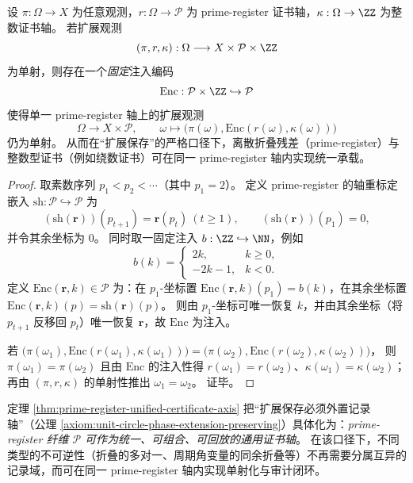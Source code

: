\begin{theorem}\label{thm:prime-register-unified-certificate-axis}
设 \(\pi:\Omega\to X\) 为任意观测，\(r:\Omega\to\mathcal{P}\) 为 prime-register 证书轴，\(\kappa:\Omega\to\ZZ\) 为整数证书轴。
若扩展观测
\[
(\pi,r,\kappa):\Omega\longrightarrow X\times\mathcal{P}\times\ZZ
\]
为单射，则存在一个\emph{固定}注入编码
\[
\mathrm{Enc}:\mathcal{P}\times\ZZ\hookrightarrow \mathcal{P}
\]
使得单一 prime-register 轴上的扩展观测
\[
\Omega\longrightarrow X\times\mathcal{P},\qquad
\omega\longmapsto\bigl(\pi(\omega),\mathrm{Enc}(r(\omega),\kappa(\omega))\bigr)
\]
仍为单射。
从而在“扩展保存”的严格口径下，离散折叠残差（prime-register）与整数型证书（例如绕数证书）可在同一 prime-register 轴内实现统一承载。
\end{theorem}
\begin{proof}
取素数序列 \(p_1<p_2<\cdots\)（其中 \(p_1=2\)）。
定义 prime-register 的轴重标定嵌入 \(\mathrm{sh}:\mathcal{P}\hookrightarrow\mathcal{P}\) 为
\[
(\mathrm{sh}(\mathbf r))(p_{t+1})=\mathbf r(p_t)\ (t\ge 1),
\qquad
(\mathrm{sh}(\mathbf r))(p_1)=0,
\]
并令其余坐标为 \(0\)。
同时取一固定注入 \(b:\ZZ\hookrightarrow\NN\)，例如
\[
b(k)=
\begin{cases}
2k, & k\ge 0,\\
-2k-1, & k<0.
\end{cases}
\]
定义
\(
\mathrm{Enc}(\mathbf r,k)\in\mathcal{P}
\)
为：在 \(p_1\)-坐标置 \(\mathrm{Enc}(\mathbf r,k)(p_1)=b(k)\)，在其余坐标置 \(\mathrm{Enc}(\mathbf r,k)(p)=\mathrm{sh}(\mathbf r)(p)\)。
则由 \(p_1\)-坐标可唯一恢复 \(k\)，并由其余坐标（将 \(p_{t+1}\) 反移回 \(p_t\)）唯一恢复 \(\mathbf r\)，故 \(\mathrm{Enc}\) 为注入。
\par
若 \(\bigl(\pi(\omega_1),\mathrm{Enc}(r(\omega_1),\kappa(\omega_1))\bigr)=\bigl(\pi(\omega_2),\mathrm{Enc}(r(\omega_2),\kappa(\omega_2))\bigr)\)，
则 \(\pi(\omega_1)=\pi(\omega_2)\) 且由 \(\mathrm{Enc}\) 的注入性得 \(r(\omega_1)=r(\omega_2)\)、\(\kappa(\omega_1)=\kappa(\omega_2)\)；
再由 \((\pi,r,\kappa)\) 的单射性推出 \(\omega_1=\omega_2\)。
证毕。
\end{proof}

\begin{remark}[意义（接口化表述）]\label{rem:prime-register-as-unified-certificate-axis}
定理 \ref{thm:prime-register-unified-certificate-axis} 把“扩展保存必须外置记录轴”（公理 \ref{axiom:unit-circle-phase-extension-preserving}）具体化为：\emph{prime-register 纤维 \(\mathcal{P}\) 可作为统一、可组合、可回放的通用证书轴}。
在该口径下，不同类型的不可逆性（折叠的多对一、周期角变量的同余折叠等）不再需要分属互异的记录域，而可在同一 prime-register 轴内实现单射化与审计闭环。
\end{remark}

